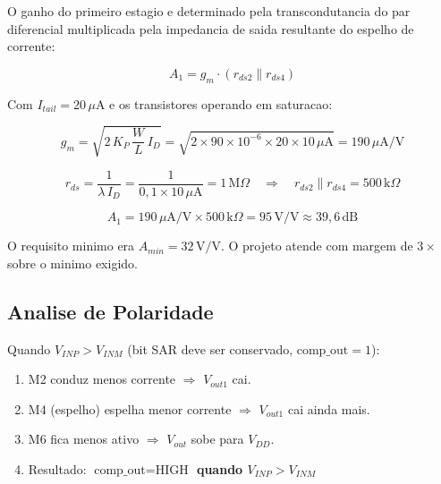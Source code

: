 \documentclass[12pt, a4paper]{article}
\begin{document}
O ganho do primeiro estagio e determinado pela transcondutancia do par diferencial
multiplicada pela impedancia de saida resultante do espelho de corrente:

\begin{equation}
  A_1 = g_m \cdot (r_{ds2} \| r_{ds4})
\end{equation}

\noindent Com $I_{tail} = 20\,\mu\text{A}$ e os transistores operando em saturacao:

\begin{equation}
  g_m = \sqrt{2\,K_P\,\frac{W}{L}\,I_{D}} = \sqrt{2 \times 90 \times 10^{-6} \times 20 \times 10\,\mu\text{A}}
      = 190\,\mu\text{A/V}
\end{equation}

\begin{equation}
  r_{ds} = \frac{1}{\lambda\, I_D} = \frac{1}{0{,}1 \times 10\,\mu\text{A}} = 1\,\text{M}\Omega
  \quad \Rightarrow \quad r_{ds2} \| r_{ds4} = 500\,\text{k}\Omega
\end{equation}

\begin{equation}
  \boxed{A_1 = 190\,\mu\text{A/V} \times 500\,\text{k}\Omega = 95\,\text{V/V} \approx 39{,}6\,\text{dB}}
\end{equation}

O requisito minimo era $A_{min} = 32\,\text{V/V}$. O projeto atende com margem de
\textbf{$3{\times}$} sobre o minimo exigido.

\subsection{Analise de Polaridade}

Quando $V_{INP} > V_{INM}$ (bit SAR deve ser conservado, $\text{comp\_out} = 1$):
\begin{enumerate}[noitemsep]
  \item M2 conduz menos corrente $\Rightarrow$ $V_{out1}$ cai.
  \item M4 (espelho) espelha menor corrente $\Rightarrow$ $V_{out1}$ cai ainda mais.
  \item M6 fica menos ativo $\Rightarrow$ $V_{out}$ sobe para $V_{DD}$.
  \item Resultado: \textbf{$\text{comp\_out} = \text{HIGH}$ quando $V_{INP} > V_{INM}$} \checkmark
\end{enumerate}

\end{document}

